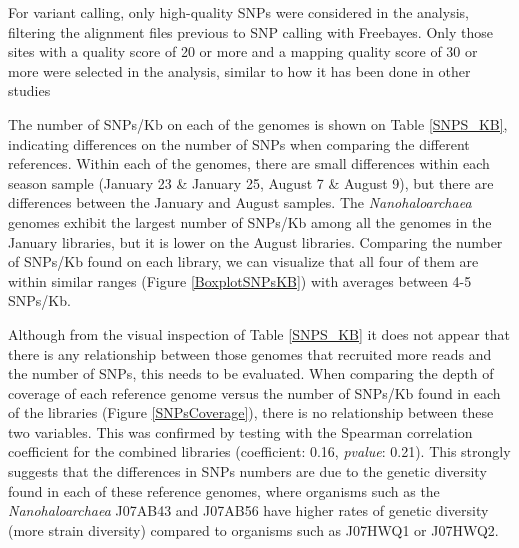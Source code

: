 For variant calling, only high-quality SNPs were considered in the analysis, filtering the alignment files previous to SNP calling with Freebayes. Only those sites with a quality score of 20 or more and a mapping quality score of 30 or more were selected in the analysis, similar to how it has been done in other studies \cite{Schloissnig:2012hx}

The number of SNPs/Kb on each of the genomes is shown on Table \ref{SNPS_KB}, indicating differences on the number of SNPs when comparing the different references. Within each of the genomes, there are small differences within each season sample (January 23 \& January 25, August 7 \& August 9), but there are differences between the January and August samples. The \textit{Nanohaloarchaea} genomes exhibit the largest number of SNPs/Kb among all the genomes in the January libraries, but it is lower on the August libraries. Comparing the number of SNPs/Kb found on each library, we can visualize that all four of them are within similar ranges (Figure \ref{BoxplotSNPsKB}) with averages between 4-5 SNPs/Kb.

Although from the visual inspection of Table \ref{SNPS_KB} it does not appear that there is any relationship between those genomes that recruited more reads and the number of SNPs, this needs to be evaluated. When comparing the depth of coverage of each reference genome versus the number of SNPs/Kb found in each of the libraries (Figure \ref{SNPsCoverage}), there is no relationship between these two variables. This was confirmed by testing with the Spearman correlation coefficient for the combined libraries (coefficient: 0.16, \textit{pvalue}: 0.21). This strongly suggests that the differences in SNPs numbers are due to the genetic diversity found in each of these reference genomes, where organisms such as the \textit{Nanohaloarchaea} J07AB43 and J07AB56 have higher rates of genetic diversity (more strain diversity) compared to organisms such as J07HWQ1 or J07HWQ2.

